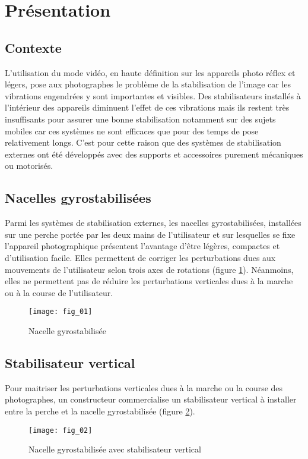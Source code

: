 \section{Présentation}
\subsection{Contexte}
L'utilisation du mode vidéo, en haute définition sur les appareils photo réflex et légers, pose aux photographes le problème de la stabilisation de l'image car les vibrations engendrées y sont importantes et visibles. Des stabilisateurs installés à l'intérieur des appareils diminuent l'effet de ces vibrations mais ils restent très insuffisants pour assurer une bonne stabilisation notamment sur des sujets mobiles car ces systèmes ne sont efficaces que pour des temps de pose relativement longs. C'est pour cette raison que des systèmes de stabilisation externes ont été développés avec des supports et accessoires purement mécaniques ou motorisés.

\subsection{Nacelles gyrostabilisées}
Parmi les systèmes de stabilisation externes, les nacelles gyrostabilisées, installées sur une perche portée par les deux mains de l'utilisateur et sur lesquelles se fixe l'appareil photographique présentent l'avantage d'être légères, compactes et d'utilisation facile. Elles permettent de corriger les perturbations dues aux mouvements de l'utilisateur selon trois axes de rotations (figure \ref{fig:01}). Néanmoins, elles ne permettent pas de réduire les perturbations verticales dues à la marche ou à la course de l'utilisateur.

\begin{figure}[H]
\centering
\texttt{[image: fig\_01]}
\caption{\label{fig:01} Nacelle gyrostabilisée}
\end{figure}


\subsection{Stabilisateur vertical}
Pour maitriser les perturbations verticales dues à la marche ou la course des photographes, un constructeur commercialise un stabilisateur vertical à installer entre la perche et la nacelle gyrostabilisée (figure \ref{fig:02}).

\begin{figure}[H]
\centering
\texttt{[image: fig\_02]}
\caption{\label{fig:02} Nacelle gyrostabilisée avec stabilisateur vertical}
\end{figure}


